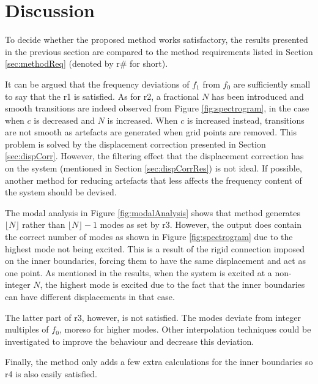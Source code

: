 \section{Discussion}
To decide whether the proposed method works satisfactory, the results presented in the previous section are compared to the method requirements listed in Section \eqref{sec:methodReq} (denoted by r\# for short). 

It can be argued that the frequency deviations of $f_1$ from $f_0$ are sufficiently small to say that the r1 is satisfied. As for r2, a fractional $N$ has been introduced and smooth transitions are indeed observed from Figure \ref{fig:spectrogram}, in the case when $c$ is decreased and $N$ is increased. When $c$ is increased instead, transitions are not smooth as artefacts are generated when grid points are removed. This problem is solved by the displacement correction presented in Section \ref{sec:dispCorr}. However, the filtering effect that the displacement correction has on the system (mentioned in Section \ref{sec:dispCorrRes}) is not ideal. If possible, another method for reducing artefacts that less affects the frequency content of the system should be devised. 

The modal analysis in Figure \ref{fig:modalAnalysis} shows that method generates $\lfloor N\rfloor$ rather than $\lfloor N\rfloor - 1$ modes as set by r3. However, the output does contain the correct number of modes as shown in Figure \ref{fig:spectrogram} due to the highest mode not being excited. This is a result of the rigid connection imposed on the inner boundaries, forcing them to have the same displacement and act as one point. As mentioned in the results, when the system is excited at a non-integer $N$, the highest mode is excited due to the fact that the inner boundaries can have different displacements in that case.

The latter part of r3, however, is not satisfied. The modes deviate from integer multiples of $f_0$, moreso for higher modes. Other interpolation techniques could be investigated to improve the behaviour and decrease this deviation.

Finally, the method only adds a few extra calculations for the inner boundaries so r4 is also easily satisfied. 
\\

